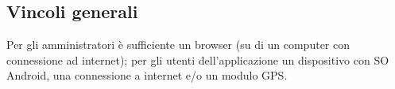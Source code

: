 \subsection{Vincoli generali}
Per gli amministratori è sufficiente un browser (su di un computer con connessione ad internet); per gli utenti dell'applicazione un dispositivo con SO Android, una connessione a internet e/o un modulo GPS.